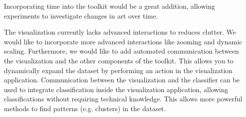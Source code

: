 Incorporating time into the toolkit would be a great addition, allowing experiments to investigate changes in art over time.

The visualization currently lacks advanced interactions to reduces clutter.
We would like to incorporate more advanced interactions like zooming and dynamic scaling.
Furthermore, we would like to add automated communication between the visualization and the other components of the toolkit.
This allows you to dynamically expand the dataset by performing an action in the visualization application.
Communication between the visualization and the classifier can be used to integrate classification inside the visualization application, allowing classifications without requiring technical knowledge.
This allows more powerful methods to find patterns (e.g. clusters) in the dataset.

